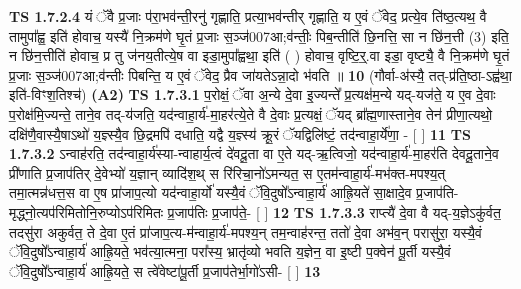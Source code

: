\documentclass[17pt]{extarticle}
\begin{document}
                  \newline
                                \textbf{ TS 1.7.2.4} \newline
                  यं ॅवै प्र॒जाः प॑रा॒भव॑न्ती॒रनु॑ गृह्णाति॒ प्रत्या॒भव॑न्तीर् गृह्णाति॒ य ए॒वं ॅवेद॒ प्रत्ये॒व ति॑ष्ठ॒त्यथ॒ वै तामुपा᳚ह्व॒ इति॑ होवाच॒ यस्यै॑ नि॒क्रम॑णे घृ॒तं प्र॒जाः स॒ञ्ज॑007आ;व॑न्तीः॒ पिब॒न्तीति॑ छि॒नत्ति॒ सा न छि॑न॒त्ती (3) इति॒ न छि॑न॒त्तीति॑ होवाच॒ प्र तु ज॑नय॒तीत्ये॒ष वा इडा॒मुपा᳚ह्वथा॒ इति॑ ( ) होवाच॒ वृष्टि॒र्॒.वा इडा॒ वृष्ट्यै॒ वै नि॒क्रम॑णे घृ॒तं प्र॒जाः स॒ञ्ज॑007आ;व॑न्तीः पिबन्ति॒ य ए॒वं ॅवेद॒ प्रैव जा॑यतेऽन्ना॒दो भ॑वति ॥ \textbf{  10} \newline
                  \newline
                      (गौर्वा-अ॑स्यै॒ तत्-प्र॑ति॒ष्ठा-ऽह्व॑था॒ इति॑-विꣳश॒तिश्च॑)  \textbf{(A2)} \newline \newline
                                        \textbf{ TS 1.7.3.1} \newline
                  प॒रोक्षं॒ ॅवा अ॒न्ये दे॒वा इ॒ज्यन्ते᳚ प्र॒त्यक्ष॑म॒न्ये यद्-यज॑ते॒ य ए॒व दे॒वाः प॒रोक्ष॑मि॒ज्यन्ते॒ ताने॒व तद्-य॑जति॒ यद॑न्वाहा॒र्य॑-मा॒हर॑त्ये॒ते वै दे॒वाः प्र॒त्यक्षं॒ ॅयद् ब्रा᳚ह्म॒णास्ताने॒व तेन॑ प्रीणा॒त्यथो॒ दक्षि॑णै॒वास्यै॒षाऽथो॑ य॒ज्ञ्स्यै॒व छि॒द्रमपि॑ दधाति॒ यद्वै य॒ज्ञ्स्य॑ क्रू॒रं ॅयद्विलि॑ष्टं॒ तद॑न्वाहा॒र्ये॑णा॒ - [ ] \textbf{  11} \newline
                  \newline
                                \textbf{ TS 1.7.3.2} \newline
                  ऽन्वाह॑रति॒ तद॑न्वाहा॒र्य॑स्या-न्वाहार्य॒त्वं दे॑वदू॒ता वा ए॒ते यद्-ऋ॒त्विजो॒ यद॑न्वाहा॒र्य॑-मा॒हर॑ति देवदू॒ताने॒व प्री॑णाति प्र॒जाप॑तिर् दे॒वेभ्यो॑ य॒ज्ञान् व्यादि॑श॒थ् स रि॑रिचा॒नो॑ऽमन्यत॒ स ए॒तम॑न्वाहा॒र्य॑-मभ॑क्त-मपश्य॒त् तमा॒त्मन्न॑धत्त॒स वा ए॒ष प्रा॑जाप॒त्यो यद॑न्वाहा॒र्यो॑ यस्यै॒वं ॅवि॒दुषो᳚ऽन्वाहा॒र्य॑ आह्रि॒यते॑ सा॒क्षादे॒व प्र॒जाप॑ति-मृद्ध्नो॒त्यप॑रिमितोनि॒रुप्योऽप॑रिमितः प्र॒जाप॑तिः प्र॒जाप॑ते॒- [ ] \textbf{  12} \newline
                  \newline
                                \textbf{ TS 1.7.3.3} \newline
                  राप्त्यै॑ दे॒वा वै यद्-य॒ज्ञेऽकु॑र्वत॒ तदसु॑रा अकुर्वत॒ ते दे॒वा ए॒तं प्रा॑जाप॒त्य-म॑न्वाहा॒र्य॑-मपश्य॒न् तम॒न्वाह॑रन्त॒ ततो॑ दे॒वा अभ॑व॒न् परासु॑रा॒ यस्यै॒वं ॅवि॒दुषो᳚ऽन्वाहा॒र्य॑ आह्रि॒यते॒ भव॑त्या॒त्मना॒ परा᳚स्य॒ भ्रातृ॑व्यो भवति य॒ज्ञेन॒ वा इ॒ष्टी प॒क्वेन॑ पू॒र्ती यस्यै॒वं ॅवि॒दुषो᳚ऽन्वाहा॒र्य॑ आह्रि॒यते॒ स त्वे॑वेष्टा॑पू॒र्ती प्र॒जाप॑तेर्भा॒गो॑ऽसी- [ ] \textbf{  13} \newline
\end{document}

